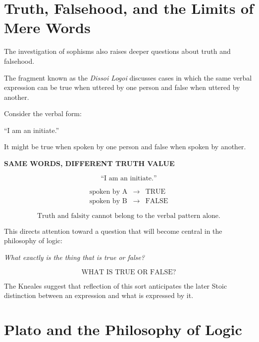\documentclass[11pt]{article}
\begin{document}
\section{Truth, Falsehood, and the Limits of Mere Words}

The investigation of sophisms also raises deeper questions about
truth and falsehood.

The fragment known as the \textit{Dissoi Logoi} discusses cases
in which the same verbal expression can be true when uttered by
one person and false when uttered by another.

Consider the verbal form:

\begin{center}
``I am an initiate.''
\end{center}

It might be true when spoken by one person and false when spoken
by another.

\begin{whiteboard}
\textbf{SAME WORDS, DIFFERENT TRUTH VALUE}

\[
\text{``I am an initiate.''}
\]

\[
\begin{array}{rcl}
\text{spoken by A} &\longrightarrow& \text{TRUE}\\
\text{spoken by B} &\longrightarrow& \text{FALSE}
\end{array}
\]

\[
\boxed{
\text{Truth and falsity cannot belong to the verbal pattern alone.}
}
\]
\end{whiteboard}

This directs attention toward a question that will become central
in the philosophy of logic:

\begin{center}
\emph{What exactly is the thing that is true or false?}
\end{center}

\begin{whiteboard}
\[
\boxed{\text{WHAT IS TRUE OR FALSE?}}
\]
\end{whiteboard}

The Kneales suggest that reflection of this sort anticipates the
later Stoic distinction between an expression and what is
expressed by it.

\section{Plato and the Philosophy of Logic}
\end{document}
